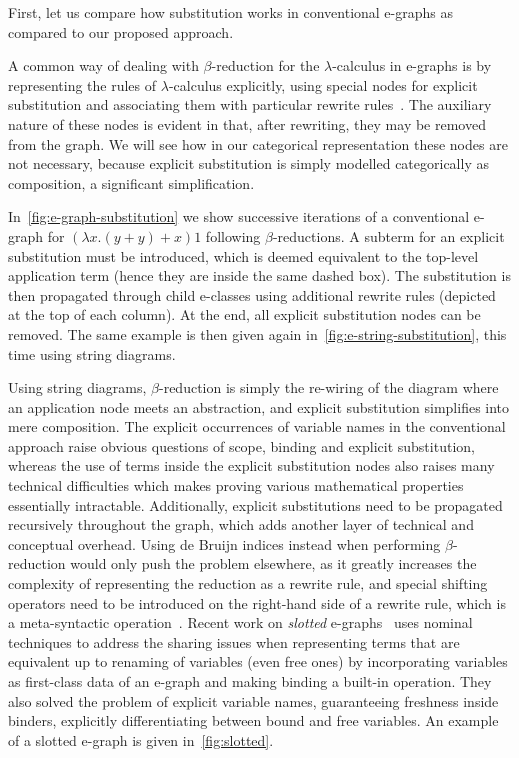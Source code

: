 First, let us compare how substitution works in conventional e-graphs as compared to our proposed approach.

A common way of dealing with $\beta$-reduction for the $\lambda$-calculus in e-graphs is by representing the rules of $\lambda$-calculus explicitly, using special nodes for explicit substitution and associating them with particular rewrite rules~\cite{EggPaper,koehler2022sketchguided}.
The auxiliary nature of these nodes is evident in that, after rewriting, they may be removed from the graph.
We will see how in our categorical representation these nodes are not necessary, because explicit substitution is simply modelled categorically as composition, a significant simplification.

In~\autoref{fig:e-graph-substitution} we show successive iterations of a conventional e-graph for $(\lambda x . (y + y) + x) 1$ following $\beta$-reductions.
A subterm for an explicit substitution must be introduced, which is deemed equivalent to the top-level application term (hence they are inside the same dashed box).
The substitution is then propagated through child e-classes using additional rewrite rules (depicted at the top of each column).
At the end, all explicit substitution nodes can be removed.
The same example is then given again in~\autoref{fig:e-string-substitution}, this time using string diagrams.

Using string diagrams, $\beta$-reduction is simply the re-wiring of the diagram where an application node meets an abstraction, and explicit substitution simplifies into mere composition.
The explicit occurrences of variable names in the conventional approach raise obvious questions of scope, binding and explicit substitution, whereas the use of terms inside the explicit substitution nodes also raises many technical difficulties which makes proving various mathematical properties essentially intractable.
Additionally, explicit substitutions need to be propagated recursively throughout the graph, which adds another layer of technical and conceptual overhead.
Using de Bruijn indices instead when performing $\beta$-reduction would only push the problem elsewhere, as it greatly increases the complexity of representing the reduction as a rewrite rule, and special shifting operators need to be introduced on the right-hand side of a rewrite rule, which is a meta-syntactic operation~\cite{koehler2022sketchguided}.
Recent work on \textit{slotted} e-graphs~\cite{slotted-egraphs} uses nominal techniques to address the sharing issues when representing terms that are equivalent up to renaming of variables (even free ones) by incorporating variables as first-class data of an e-graph and making binding a built-in operation.
They also solved the problem of explicit variable names, guaranteeing freshness inside binders, explicitly differentiating between bound and free variables.
An example of a slotted e-graph is given in~\autoref{fig:slotted}.

